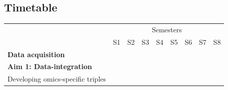 \documentclass[twoside,fontsize=10pt]{article}
\begin{document}
\subsection*{Timetable}
\begin{table}[h]
\begin{center}
\begin{tabular}{lllllllll}
                                                & \multicolumn{8}{c}{Semesters}                                                                                                                                                                                                                                                                                                                                                                                 \\ \cline{2-9} 
                                                & S1                                              & S2                                              & S3                                              & S4                                              & S5                                              & S6                                              & S7                                              & S8                                              \\ \hline
\textbf{Data acquisition}                       & \cellcolor[HTML]{343434}{\color[HTML]{656565} } & \cellcolor[HTML]{343434}{\color[HTML]{656565} } & \cellcolor[HTML]{343434}{\color[HTML]{656565} } & \cellcolor[HTML]{343434}{\color[HTML]{656565} } & \cellcolor[HTML]{343434}{\color[HTML]{656565} } & \cellcolor[HTML]{343434}{\color[HTML]{656565} } & \cellcolor[HTML]{343434}{\color[HTML]{656565} } & \cellcolor[HTML]{343434}{\color[HTML]{656565} } \\
\textbf{Aim 1: Data-integration}                & \cellcolor[HTML]{343434}                        & \cellcolor[HTML]{343434}                        & \cellcolor[HTML]{343434}                        &                                                 &                                                 &                                                 &                                                 &                                                 \\
\hspace*{1em} Developing omics-specific triples & \cellcolor[HTML]{656565}                        &                                                 &                                                 &                                                 &                                                 &                                                 &                                                 &                                                 \\

\end{tabular}
\end{center}
\end{table}
\end{document}
